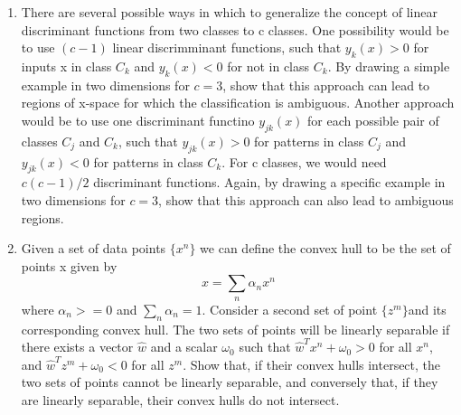 \documentclass[a4paper]{article}
\begin{document}
\begin{enumerate}
		\item
		There are several possible ways in which to generalize the concept of linear discriminant functions from two classes to c classes. One possibility would be to use $(c-1)$ linear discrimminant functions, such that $y_k(x)>0$ for inputs x in class $C_k$ and $y_k(x) < 0$ for not in class $C_k$. By drawing a simple example in two dimensions for $c=3$, show that this approach can lead to regions of x-space for which the classification is ambiguous. Another approach would be to use one discriminant functino $y_{jk}(x)$ for each possible pair of classes $C_j$ and $C_k$, such that $y_{jk}(x) >0$ for patterns in class $C_j$ and $y_{jk}(x) <0$ for patterns in class $C_k$. For c classes, we would need $c(c-1)/2$ discriminant functions. Again, by drawing a specific example in two dimensions for $c=3$, show that this approach can also lead to ambiguous regions.
		\item
		Given a set of data points $\{x^n\}$ we can define the convex hull to be the set of points x given by
		\begin{equation*}
			x = \sum_n \alpha_n x^n
		\end{equation*}
		where $\alpha_n >=0$ and $\sum_n \alpha_n = 1$. Consider a second set of point $\{z^m\}$and its corresponding convex hull. The two sets of points will be linearly separable if there exists a vector $\hat{w}$ and a scalar $\omega_0$ such that $\hat{w}^Tx^n+\omega_0 >0$ for all $x^n$, and $\hat{w}^Tz^m + \omega_0<0$ for all $z^m$. Show that, if their convex hulls intersect, the two sets of points cannot be linearly separable, and conversely that, if they are linearly separable, their convex hulls do not intersect.
	\end{enumerate}
\end{document}
